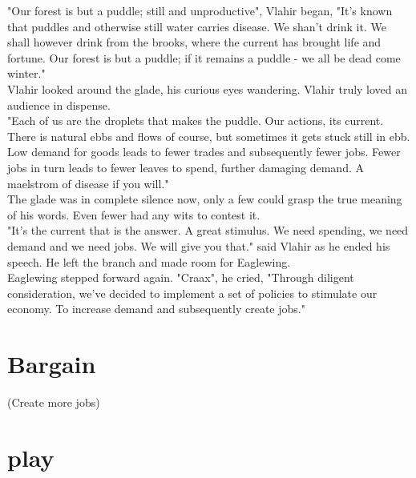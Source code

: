 \documentclass[smalldemyvopaper,11pt,twoside,onecolumn,openright,extrafontsizes]{memoir}
\newlength\drop
\begin{document}
"Our forest is but a puddle; still and unproductive", Vlahir began, "It's known that puddles and otherwise still water carries disease. We shan't drink it.
We shall however drink from the brooks, where the current has brought life and fortune. Our forest is but a puddle; if it remains a puddle - we all be dead come winter."\\

Vlahir looked around the glade, his curious eyes wandering. Vlahir truly loved an audience in dispense.\\

"Each of us are the droplets that makes the puddle. Our actions, its current. There is natural ebbs and flows of course, but sometimes it gets stuck still in ebb. Low demand for goods leads to fewer trades and subsequently fewer jobs. Fewer jobs in turn leads to fewer leaves to spend, further damaging demand. A maelstrom of disease if you will."\\

The glade was in complete silence now, only a few could grasp the true meaning of his words. Even fewer had any wits to contest it. \\

"It's the current that is the answer. A great stimulus. We need spending, we need demand and we need jobs. We will give you that." said Vlahir as he ended his speech. He left the branch and made room for Eaglewing.\\

Eaglewing stepped forward again. "Craax", he cried, "Through diligent consideration, we've decided to implement a set of policies to stimulate our economy. To increase demand and subsequently create jobs."







\chapter{Bargain}


(Create more jobs)

\chapter{play}
\end{document}
